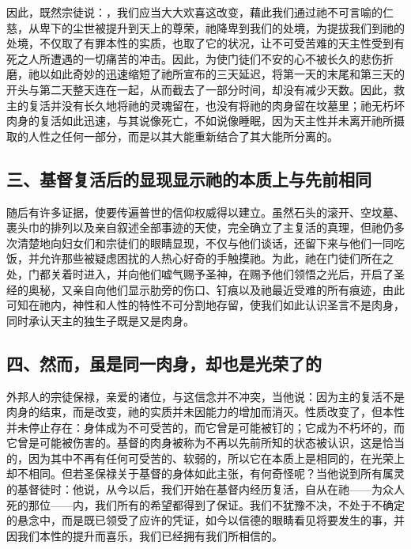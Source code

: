 因此，既然宗徒说：，我们应当大大欢喜这改变，藉此我们通过祂不可言喻的仁慈，从卑下的尘世被提升到天上的尊荣，祂降卑到我们的处境，为提拔我们到祂的处境，不仅取了有罪本性的实质，也取了它的状况，让不可受苦难的天主性受到有死之人所遭遇的一切痛苦的冲击。因此，为使门徒们不安的心不被长久的悲伤折磨，祂以如此奇妙的迅速缩短了祂所宣布的三天延迟，将第一天的末尾和第三天的开头与第二天整天连在一起，从而截去了一部分时间，却没有减少天数。因此，救主的复活并没有长久地将祂的灵魂留在，也没有将祂的肉身留在坟墓里；祂无朽坏肉身的复活如此迅速，与其说像死亡，不如说像睡眠，因为天主性并未离开祂所摄取的人性之任何一部分，而是以其大能重新结合了其大能所分离的。\par


\subsection{三、基督复活后的显现显示祂的本质上与先前相同}

随后有许多证据，使要传遍普世的信仰权威得以建立。虽然石头的滚开、空坟墓、裹头巾的排列以及亲自叙述全部事迹的天使，完全确立了主复活的真理，但祂仍多次清楚地向妇女们和宗徒们的眼睛显现，不仅与他们谈话，还留下来与他们一同吃饭，并允许那些被疑虑困扰的人热心好奇的手触摸祂。为此，祂在门徒们所在之处，门都关着时进入，并向他们嘘气赐予圣神，在赐予他们领悟之光后，开启了圣经的奥秘，又亲自向他们显示肋旁的伤口、钉痕以及祂最近受难的所有痕迹，由此可知在祂内，神性和人性的特性不可分割地存留，使我们如此认识圣言不是肉身，同时承认天主的独生子既是又是肉身。\par


\subsection{四、然而，虽是同一肉身，却也是光荣了的}

外邦人的宗徒保禄，亲爱的诸位，与这信念并不冲突，当他说：因为主的复活不是肉身的结束，而是改变，祂的实质并未因能力的增加而消灭。性质改变了，但本性并未停止存在：身体成为不可受苦的，而它曾是可能被钉的；它成为不朽坏的，而它曾是可能被伤害的。基督的肉身被称为不再以先前所知的状态被认识，这是恰当的，因为其中不再有任何可受苦的、软弱的，所以它在本质上是相同的，在光荣上却不相同。但若圣保禄关于基督的身体如此主张，有何奇怪呢？当他说到所有属灵的基督徒时：他说，从今以后，我们开始在基督内经历复活，自从在祂——为众人死的那位——内，我们所有的希望都得到了保证。我们不犹豫不决，不处于不确定的悬念中，而是既已领受了应许的凭证，如今以信德的眼睛看见将要发生的事，并因我们本性的提升而喜乐，我们已经拥有我们所相信的。\par

